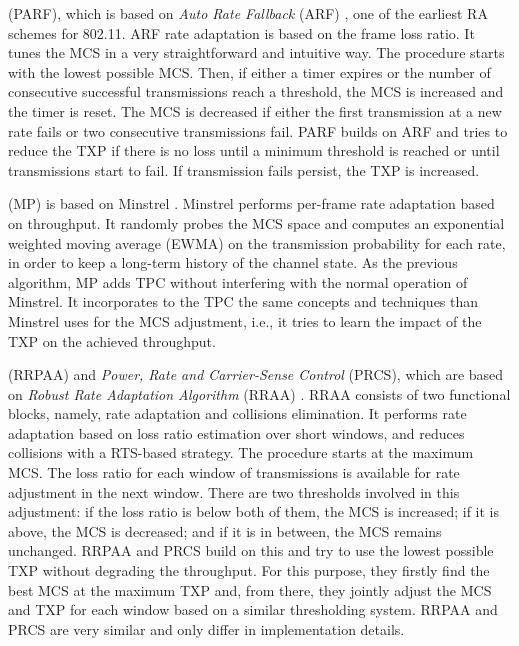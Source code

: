 \documentclass[twoside,nohyper]{tufte-book}
\providecommand{\tightlist}{%
  \setlength{\itemsep}{0pt}\setlength{\parskip}{0pt}}
\begin{document}
\begin{description}
\tightlist
\item[Power-controlled Auto Rate Fallback]
(PARF),\cite[0pt]{Akella:2005} which is based on \emph{Auto Rate Fallback} (ARF) \citep{kamerman1997wavelan}, one of the earliest RA schemes for 802.11. ARF rate adaptation is based on the frame loss ratio. It tunes the MCS in a very straightforward and intuitive way. The procedure starts with the lowest possible MCS. Then, if either a timer expires or the number of consecutive successful transmissions reach a threshold, the MCS is increased and the timer is reset. The MCS is decreased if either the first transmission at a new rate fails or two consecutive transmissions fail. PARF builds on ARF and tries to reduce the TXP if there is no loss until a minimum threshold is reached or until transmissions start to fail. If transmission fails persist, the TXP is increased.
\item[Minstrel-Piano]
(MP)\cite[0pt]{huehn2012} is based on Minstrel \citep{minstrel}. Minstrel performs per-frame rate adaptation based on throughput. It randomly probes the MCS space and computes an exponential weighted moving average (EWMA) on the transmission probability for each rate, in order to keep a long-term history of the channel state. As the previous algorithm, MP adds TPC without interfering with the normal operation of Minstrel. It incorporates to the TPC the same concepts and techniques than Minstrel uses for the MCS adjustment, i.e., it tries to learn the impact of the TXP on the achieved throughput.
\item[Robust Rate and Power Adaptation Algorithm]
(RRPAA) and \emph{Power, Rate and Carrier-Sense Control} (PRCS),\cite[0pt]{richart2015} which are based on \emph{Robust Rate Adaptation Algorithm} (RRAA) \citep{Wong2006}. RRAA consists of two functional blocks, namely, rate adaptation and collisions elimination. It performs rate adaptation based on loss ratio estimation over short windows, and reduces collisions with a RTS-based strategy. The procedure starts at the maximum MCS. The loss ratio for each window of transmissions is available for rate adjustment in the next window. There are two thresholds involved in this adjustment: if the loss ratio is below both of them, the MCS is increased; if it is above, the MCS is decreased; and if it is in between, the MCS remains unchanged. RRPAA and PRCS build on this and try to use the lowest possible TXP without degrading the throughput. For this purpose, they firstly find the best MCS at the maximum TXP and, from there, they jointly adjust the MCS and TXP for each window based on a similar thresholding system. RRPAA and PRCS are very similar and only differ in implementation details.
\end{description}
\end{document}
